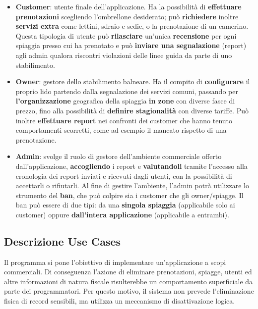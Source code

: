 \documentclass[a4paper,11pt]{article}
\begin{document}
\begin{itemize}
	\item \textbf{Customer}: utente finale dell'applicazione. Ha la possibilità di \textbf{effettuare prenotazioni} scegliendo l'ombrellone desiderato; può \textbf{richiedere} inoltre \textbf{servizi extra} come lettini, sdraio e sedie, o la prenotazione di un camerino. Questa tipologia di utente può \textbf{rilasciare} un'unica \textbf{recensione} per ogni spiaggia presso cui ha prenotato e può \textbf{inviare una segnalazione} (report) agli admin qualora riscontri violazioni delle linee guida da parte di uno stabilimento.
	
	\item \textbf{Owner}: gestore dello stabilimento balneare. Ha il compito di \textbf{configurare} il proprio lido partendo dalla segnalazione dei servizi comuni, passando per \textbf{l'organizzazione} geografica della spiaggia \textbf{in zone} con diverse fasce di prezzo, fino alla possibilità di \textbf{definire stagionalità} con diverse tariffe. Può inoltre \textbf{effettuare report} nei confronti dei customer che hanno tenuto comportamenti scorretti, come ad esempio il mancato rispetto di una prenotazione.
	
	\item \textbf{Admin}: svolge il ruolo di gestore dell'ambiente commerciale offerto dall'applicazione, \textbf{accogliendo} i report e \textbf{valutandoli} tramite l'accesso alla cronologia dei report inviati e ricevuti dagli utenti, con la possibilità di accettarli o rifiutarli. Al fine di gestire l'ambiente, l'admin potrà utilizzare lo strumento del \textbf{ban}, che può colpire sia i customer che gli owner/spiagge. Il ban può essere di due tipi: da una \textbf{singola spiaggia} (applicabile solo ai customer) oppure \textbf{dall'intera applicazione} (applicabile a entrambi).
\end{itemize}

\newpage

\subsection{Descrizione Use Cases}
Il programma si pone l'obiettivo di implementare un'applicazione a scopi commerciali. Di conseguenza l'azione di eliminare prenotazioni, spiagge, utenti ed altre informazioni di natura fiscale risulterebbe un comportamento superficiale da parte dei programmatori. Per questo motivo, il sistema non prevede l'eliminazione fisica di record sensibili, ma utilizza un meccanismo di disattivazione logica.
\end{document}
